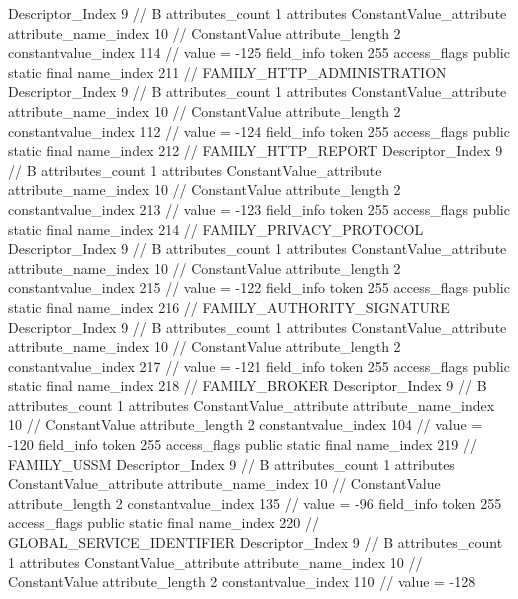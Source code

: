{{{{{				Descriptor_Index	9		// B
				attributes_count	1
				attributes {
				ConstantValue_attribute {
					attribute_name_index	10		// ConstantValue
					attribute_length	2
					constantvalue_index	114		// value = -125
				}
				}
			}
			field_info {
				token	255
				access_flags	public static final
				name_index	211		// FAMILY_HTTP_ADMINISTRATION
				Descriptor_Index	9		// B
				attributes_count	1
				attributes {
				ConstantValue_attribute {
					attribute_name_index	10		// ConstantValue
					attribute_length	2
					constantvalue_index	112		// value = -124
				}
				}
			}
			field_info {
				token	255
				access_flags	public static final
				name_index	212		// FAMILY_HTTP_REPORT
				Descriptor_Index	9		// B
				attributes_count	1
				attributes {
				ConstantValue_attribute {
					attribute_name_index	10		// ConstantValue
					attribute_length	2
					constantvalue_index	213		// value = -123
				}
				}
			}
			field_info {
				token	255
				access_flags	public static final
				name_index	214		// FAMILY_PRIVACY_PROTOCOL
				Descriptor_Index	9		// B
				attributes_count	1
				attributes {
				ConstantValue_attribute {
					attribute_name_index	10		// ConstantValue
					attribute_length	2
					constantvalue_index	215		// value = -122
				}
				}
			}
			field_info {
				token	255
				access_flags	public static final
				name_index	216		// FAMILY_AUTHORITY_SIGNATURE
				Descriptor_Index	9		// B
				attributes_count	1
				attributes {
				ConstantValue_attribute {
					attribute_name_index	10		// ConstantValue
					attribute_length	2
					constantvalue_index	217		// value = -121
				}
				}
			}
			field_info {
				token	255
				access_flags	public static final
				name_index	218		// FAMILY_BROKER
				Descriptor_Index	9		// B
				attributes_count	1
				attributes {
				ConstantValue_attribute {
					attribute_name_index	10		// ConstantValue
					attribute_length	2
					constantvalue_index	104		// value = -120
				}
				}
			}
			field_info {
				token	255
				access_flags	public static final
				name_index	219		// FAMILY_USSM
				Descriptor_Index	9		// B
				attributes_count	1
				attributes {
				ConstantValue_attribute {
					attribute_name_index	10		// ConstantValue
					attribute_length	2
					constantvalue_index	135		// value = -96
				}
				}
			}
			field_info {
				token	255
				access_flags	public static final
				name_index	220		// GLOBAL_SERVICE_IDENTIFIER
				Descriptor_Index	9		// B
				attributes_count	1
				attributes {
				ConstantValue_attribute {
					attribute_name_index	10		// ConstantValue
					attribute_length	2
					constantvalue_index	110		// value = -128
}}}}}}}
